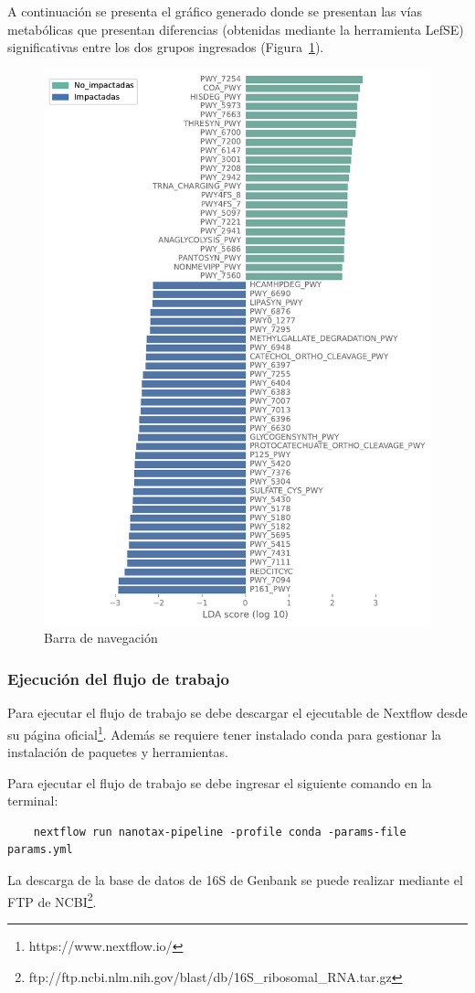 A continuación se presenta el gráfico generado donde se presentan las vías metabólicas que presentan diferencias (obtenidas mediante la herramienta LefSE) significativas entre los dos grupos ingresados  (Figura~\ref{fig:pipeline-lefse}).
    \begin{figure}[H]
        \includegraphics[width=0.7\linewidth]{images/pipeline/lefse_plot.pdf}
        \caption{Barra de navegación}
        \label{fig:pipeline-lefse}
    \end{figure}
\subsubsection{Ejecución del flujo de trabajo}\label{pipeline:how_to_run}
Para ejecutar el flujo de trabajo se debe descargar el ejecutable de Nextflow desde su página oficial\footnote{https://www.nextflow.io/}. 
Además se requiere tener instalado conda para gestionar la instalación de paquetes y herramientas.

Para ejecutar el flujo de trabajo se debe ingresar el siguiente comando en la terminal:
\begin{verbatim}
    nextflow run nanotax-pipeline -profile conda -params-file params.yml

\end{verbatim}
La descarga de la base de datos de 16S de Genbank se puede realizar mediante el FTP de NCBI\footnote{ftp://ftp.ncbi.nlm.nih.gov/blast/db/16S\_ribosomal\_RNA.tar.gz}.

